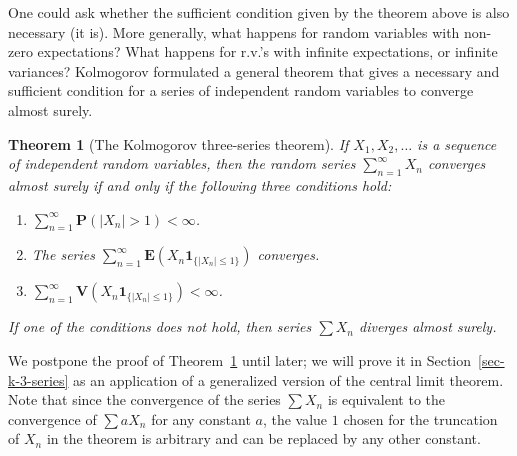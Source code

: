 \documentclass[12pt]{article}
\newtheorem{thm}{Theorem}[section]
\newcommand{\prob}{\mathbf{P}}
\newcommand{\expec}{\mathbf{E}}
\newcommand{\var}{\mathbf{V}}
\newcommand{\ind}{\textbf{1}}
\theoremstyle{example}
\begin{document}
One could ask whether the sufficient condition given by the theorem above is also necessary (it is). More generally, what happens for random variables with non-zero expectations? What happens for r.v.'s with infinite expectations, or infinite variances? Kolmogorov formulated a general theorem that gives a necessary and sufficient condition for a series of independent random variables to converge almost surely. 

\begin{thm}[The Kolmogorov three-series theorem]
\label{thm-three-series}
If $X_1,X_2,\ldots$ is a sequence of independent random variables, then the random series $\sum_{n=1}^\infty X_n$ converges almost surely if and only if the following three conditions hold:
\begin{enumerate}
\item $\sum_{n=1}^\infty \prob(|X_n|>1) < \infty$.
\item The series $\sum_{n=1}^\infty \expec(X_n \ind_{\{|X_n|\le 1\}})$ converges.
\item $\sum_{n=1}^\infty \var(X_n \ind_{\{|X_n| \le 1\}}) < \infty$.
\end{enumerate}
If one of the conditions does not hold, then series $\sum X_n$ diverges almost surely.
\end{thm}

We postpone the proof of Theorem~\ref{thm-three-series} until later; we will prove it in Section~\ref{sec-k-3-series} as an application of a generalized version of the central limit theorem. Note that since the convergence of the series $\sum X_n$ is equivalent to the convergence of $\sum a X_n$ for any constant $a$, the value $1$ chosen for the truncation of $X_n$ in the theorem is arbitrary and can be replaced by any other constant.
\end{document}
